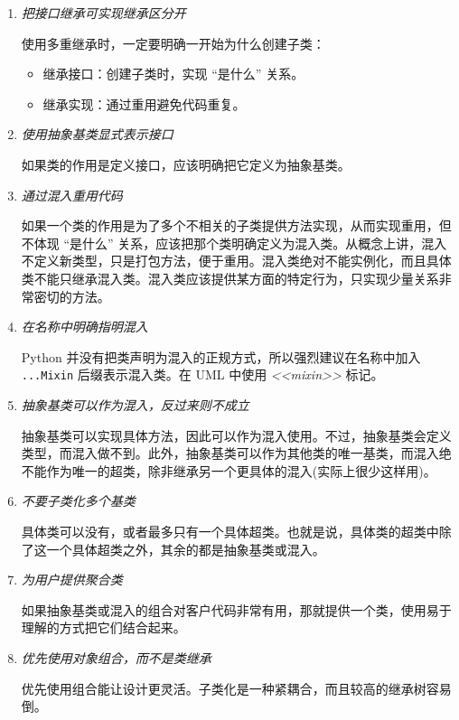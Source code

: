 \begin{enumerate}
    \item \textit{把接口继承可实现继承区分开} 
    
    使用多重继承时，一定要明确一开始为什么创建子类：
    \begin{itemize}
        \item 继承接口：创建子类时，实现 ``是什么'' 关系。
        \item 继承实现：通过重用避免代码重复。
    \end{itemize}

    \item \textit{使用抽象基类显式表示接口} 
    
    如果类的作用是定义接口，应该明确把它定义为抽象基类。

    \item \textit{通过混入重用代码} 
    
    如果一个类的作用是为了多个不相关的子类提供方法实现，从而实现重用，但不体现 ``是什么'' 关系，应该把那个类明确定义为混入类。从概念上讲，混入不定义新类型，只是打包方法，便于重用。混入类绝对不能实例化，而且具体类不能只继承混入类。混入类应该提供某方面的特定行为，只实现少量关系非常密切的方法。

    \item \textit{在名称中明确指明混入} 
    
    Python 并没有把类声明为混入的正规方式，所以强烈建议在名称中加入 \texttt{...Mixin} 后缀表示混入类。在 UML 中使用 \textit{<<mixin>>} 标记。

    \item \textit{抽象基类可以作为混入，反过来则不成立} 
    
    抽象基类可以实现具体方法，因此可以作为混入使用。不过，抽象基类会定义类型，而混入做不到。此外，抽象基类可以作为其他类的唯一基类，而混入绝不能作为唯一的超类，除非继承另一个更具体的混入(实际上很少这样用)。

    \item \textit{不要子类化多个基类} 
    
    具体类可以没有，或者最多只有一个具体超类。也就是说，具体类的超类中除了这一个具体超类之外，其余的都是抽象基类或混入。

    \item \textit{为用户提供聚合类} 
    
    如果抽象基类或混入的组合对客户代码非常有用，那就提供一个类，使用易于理解的方式把它们结合起来。

    \item \textit{优先使用对象组合，而不是类继承} 
    
    优先使用组合能让设计更灵活。子类化是一种紧耦合，而且较高的继承树容易倒。
\end{enumerate}

\newpage